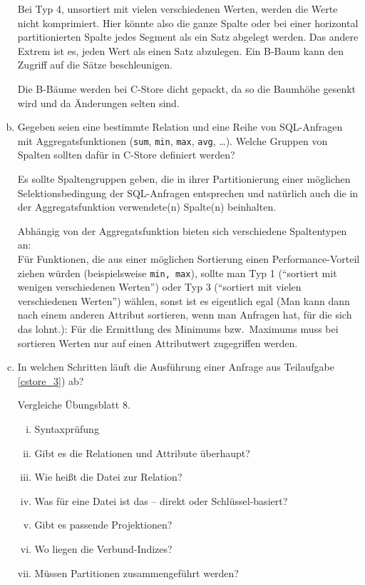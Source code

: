 \begin{enumerate}[a)]
\begin{solution}
	Bei Typ 4, unsortiert mit vielen verschiedenen Werten, werden die Werte nicht komprimiert.
	Hier könnte also die ganze Spalte oder bei einer horizontal partitionierten Spalte jedes Segment als ein Satz abgelegt werden.
	Das andere Extrem ist es, jeden Wert als einen Satz abzulegen. Ein B-Baum kann den Zugriff auf die Sätze beschleunigen.

	Die B-Bäume werden bei C-Store dicht gepackt, da so die Baumhöhe gesenkt wird und da Änderungen selten sind.
	\end{solution}

	\item \label{cstore_3} Gegeben seien eine bestimmte Relation und eine Reihe von SQL-Anfragen mit Aggregatsfunktionen (\texttt{sum}, \texttt{min}, \texttt{max}, \texttt{avg}, \ldots ).
	Welche Gruppen von Spalten sollten dafür in C-Store definiert werden?

	\begin{solution}
	Es sollte Spaltengruppen geben, die in ihrer Partitionierung einer möglichen Selektionsbedingung der SQL-Anfragen entsprechen und natürlich auch die in der Aggregatsfunktion verwendete(n) Spalte(n) beinhalten.

	Abhängig von der Aggregatsfunktion bieten sich verschiedene Spaltentypen an: \\
	Für Funktionen, die aus einer möglichen Sortierung einen Performance-Vorteil ziehen würden (beispielsweise \texttt{min, max}), sollte man Typ 1 ("`sortiert mit wenigen verschiedenen Werten"') oder Typ 3 ("`sortiert mit vielen verschiedenen Werten"') wählen, sonst ist es eigentlich egal (Man kann dann nach einem anderen Attribut sortieren, wenn man Anfragen hat, für die sich das lohnt.): Für die Ermittlung des Minimums bzw.\ Maximums muss bei sortieren Werten nur auf einen Attributwert zugegriffen werden.
	\end{solution}

	\item In welchen Schritten läuft die Ausführung einer Anfrage aus Teilaufgabe \ref{cstore_3}) ab?

	\begin{solution}
	Vergleiche Übungsblatt 8.
	\begin{enumerate}[i)]
		\item Syntaxprüfung
		\item Gibt es die Relationen und Attribute überhaupt?
		\item Wie heißt die Datei zur Relation?
		\item Was für eine Datei ist das -- direkt oder Schlüssel-basiert?
		\item Gibt es passende Projektionen?
		\item Wo liegen die Verbund-Indizes?
		\item Müssen Partitionen zusammengeführt werden?
	\end{enumerate}
	\end{solution}
\end{enumerate}
